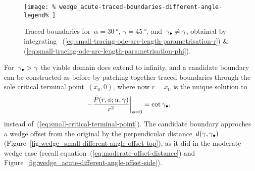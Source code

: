 \begin{figure}
  \newcommand*{\subfigurewidth}{0.4\textwidth}
  \centering
  \texttt{[image: \%
    wedge\_acute-traced-boundaries-different-angle-legend\%
  ]}
  \hspace*{\fill}
  \begin{subfigure}[t]{\subfigurewidth}
  \end{subfigure}
    \hfill
  \begin{subfigure}[t]{\subfigurewidth}
  \end{subfigure}
  \hspace*{\fill}
  \caption{
    Traced boundaries for~$\alpha = \SI{30}{\degree}$,
    $\gamma = \SI{45}{\degree}$, and~$\gamma_\bullet \ne \gamma$,
    obtained by integrating~%
      (\ref{eq:small-tracing-ode-arc-length-parametrisation-r})
    \&~%
      (\ref{eq:small-tracing-ode-arc-length-parametrisation-phi}).
  }
  \label{fig:wedge_small-traced-boundaries-different-angle}
\end{figure}

For~$\gamma_\bullet > \gamma$ the viable domain does extend to infinity,
and a candidate boundary can be constructed as before
by patching together traced boundaries through
the sole critical terminal point~$(x_0, 0)$,
where now $r = x_0$ is the unique solution to
\begin{equation}
  \eval*{
    -\frac{\desing{P}(r, \phi; \alpha, \gamma)}{r^2}
  }_{\phi=0}
    = \cot\gamma_\tr.
  \label{eq:small-critical-terminal-point-different-angle}
\end{equation}
instead of~(\ref{eq:small-critical-terminal-point}).
The candidate boundary approches a wedge offset from the original
by the perpendicular distance~$d (\gamma, \gamma_\bullet)$
(Figure~\ref{fig:wedge_small-different-angle-offset-top}),
as it did in the moderate wedge case
(recall equation~(\ref{eq:moderate-offset-distance})
and Figure~\ref{fig:wedge_acute-different-angle-offset-side}).

\begin{figure}
\end{figure}

